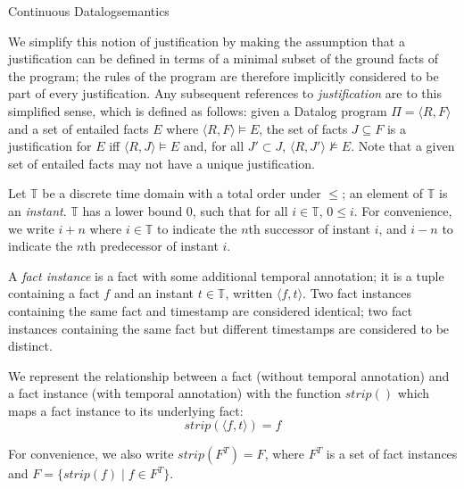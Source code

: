 \begin{nestedsection}{Continuous Datalog}{semantics}
\begin{definition}[Justification]
We simplify this notion of justification by making the assumption that
a justification can be defined in terms of a minimal subset of the
ground facts of the program; the rules of the program are therefore
implicitly considered to be part of every justification. Any
subsequent references to {\em justification} are to this simplified
sense, which is defined as follows: given a Datalog program $\Pi =
\langle R, F \rangle$ and a set of entailed facts $E$ where $\langle
R, F \rangle \models E$, the set of facts $J \subseteq F$ is a
justification for $E$ iff $\langle R, J \rangle \models E$ and, for
all $J' \subset J$, $\langle R, J' \rangle \not\models E$. Note that a
given set of entailed facts may not have a unique justification.

\end{definition}

\begin{definition}

Let $\mathbb{T}$ be a discrete time domain with a total order under
$\leqslant$; an element of $\mathbb{T}$ is an {\em instant}.
$\mathbb{T}$ has a lower bound $0$, such that for all $i \in
\mathbb{T}$, $0 \leqslant i$. For convenience, we write $i+n$ where $i
\in \mathbb{T}$ to indicate the $n$th successor of instant $i$,
and $i-n$ to indicate the $n$th predecessor of instant $i$.

\end{definition}

\begin{definition}

A {\em fact instance} is a fact with some additional temporal
annotation; it is a tuple containing a fact $f$ and an instant $t \in
\mathbb{T}$, written $\langle f, t \rangle$. Two fact instances
containing the same fact and timestamp are considered identical; two
fact instances containing the same fact but different timestamps are
considered to be distinct.

We represent the relationship between a fact (without temporal
annotation) and a fact instance (with temporal annotation) with the
function $strip()$ which maps a fact instance to its underlying fact:
\[ strip(\langle f, t\rangle) = f \]

For convenience, we also write $strip(F^T) = F$, where $F^T$ is a set
of fact instances and $F = \{ strip(f) \mid f \in F^T \}$.

\end{definition}


\end{nestedsection}
